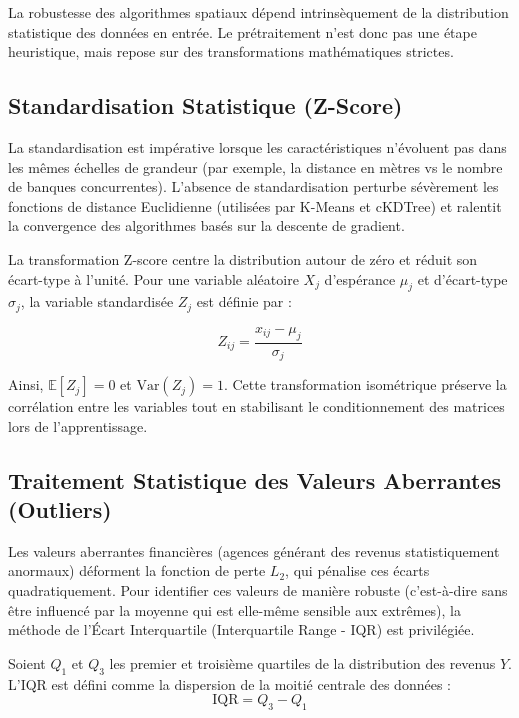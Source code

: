 \documentclass[11pt,a4paper,twoside]{report}
\begin{document}
La robustesse des algorithmes spatiaux dépend intrinsèquement de la distribution statistique des données en entrée. Le prétraitement n'est donc pas une étape heuristique, mais repose sur des transformations mathématiques strictes.

\subsection{Standardisation Statistique (Z-Score)}

La standardisation est impérative lorsque les caractéristiques n'évoluent pas dans les mêmes échelles de grandeur (par exemple, la distance en mètres vs le nombre de banques concurrentes). L'absence de standardisation perturbe sévèrement les fonctions de distance Euclidienne (utilisées par K-Means et cKDTree) et ralentit la convergence des algorithmes basés sur la descente de gradient.

La transformation Z-score centre la distribution autour de zéro et réduit son écart-type à l'unité. Pour une variable aléatoire $X_j$ d'espérance $\mu_j$ et d'écart-type $\sigma_j$, la variable standardisée $Z_j$ est définie par :

\begin{equation}
Z_{ij} = \frac{x_{ij} - \mu_j}{\sigma_j}
\end{equation}

Ainsi, $\mathbb{E}[Z_j] = 0$ et $\text{Var}(Z_j) = 1$. Cette transformation isométrique préserve la corrélation entre les variables tout en stabilisant le conditionnement des matrices lors de l'apprentissage.

\subsection{Traitement Statistique des Valeurs Aberrantes (Outliers)}

Les valeurs aberrantes financières (agences générant des revenus statistiquement anormaux) déforment la fonction de perte $L_2$, qui pénalise ces écarts quadratiquement. Pour identifier ces valeurs de manière robuste (c'est-à-dire sans être influencé par la moyenne qui est elle-même sensible aux extrêmes), la méthode de l'Écart Interquartile (Interquartile Range - IQR) est privilégiée.

Soient $Q_1$ et $Q_3$ les premier et troisième quartiles de la distribution des revenus $Y$. L'IQR est défini comme la dispersion de la moitié centrale des données :
\begin{equation}
\text{IQR} = Q_3 - Q_1
\end{equation}
\end{document}
